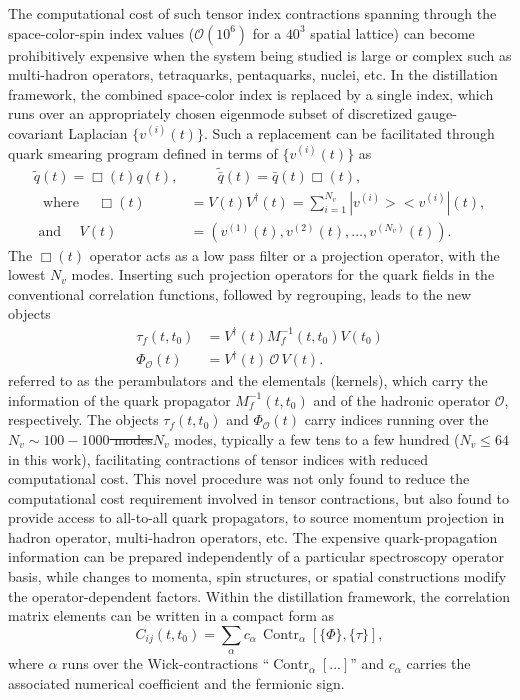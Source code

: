 \documentclass[a4paper,fleqn]{cas-dc}
\newcommand{\del}[1]{{\color{red}\sout{#1}}}
\newcommand{\add}[1]{{\color{blue}#1}}
\begin{document}
The computational cost of such tensor index contractions spanning through the space-color-spin index values ($\mathcal{O}(10^6)$ for a $40^3$ spatial lattice) can become prohibitively expensive when the system being studied is large or complex such as multi-hadron operators, tetraquarks, pentaquarks, nuclei, etc. In the distillation framework, the combined space-color index is replaced by a single index, which runs over an appropriately chosen eigenmode subset of discretized gauge-covariant Laplacian $\{v^{(i)}(t)\}$. Such a replacement can be facilitated through quark smearing program defined in terms of $\{v^{(i)}(t)\}$ as
\begin{align}
\tilde q(t)=\Box(t)q(t), &\qquad
\tilde{\bar q}(t)=\bar q(t)\Box(t), \nonumber \\
\mbox{~~where ~~~} \Box(t)&=V(t)V^\dagger(t) = \sum_{i=1}^{N_v}|v^{(i)}><v^{(i)}|(t),  \nonumber \\
\mbox{~and ~~~} V(t)&=\left(v^{(1)}(t),v^{(2)}(t),\ldots,v^{(N_v)}(t)\right). \label{eq:distill}
\end{align}
The $\Box(t)$ operator acts as a low pass filter or a projection operator, with the lowest $N_v$ modes. Inserting such projection operators for the quark fields in the conventional correlation functions, followed by regrouping, leads to the new objects
\begin{align}
\tau_f(t,t_0) &= V^\dagger(t) M_f^{-1}(t,t_0) V(t_0) \label{eq:peram}\\
\Phi_{\mathcal{O}}(t)&= V^\dagger(t)\,\mathcal{O}\,V(t). \label{eq:kernel} 
\end{align}
referred to as the perambulators and the elementals (kernels), which carry the information of the quark propagator $M_f^{-1}(t,t_0)$ and of the hadronic operator $\mathcal O$, respectively. The objects $\tau_f(t,t_0)$ and $\Phi_{\mathcal{O}}(t)$ carry indices running over the \del{$N_v\sim100-1000$ modes}\add{$N_v$ modes, typically a few tens to a few hundred ($N_v\le64$ in this work),} facilitating contractions of tensor indices with reduced computational cost. This novel procedure was not only found to reduce the computational cost requirement involved in tensor contractions, but also found to provide access to all-to-all quark propagators, to source momentum projection in hadron operator, multi-hadron operators, etc. The expensive quark-propagation information can be prepared independently of a particular spectroscopy operator basis, while changes to momenta, spin structures, or spatial constructions modify the operator-dependent factors. Within the distillation framework, the correlation matrix elements can be written in a compact form as
\begin{equation}
C_{ij}(t,t_0)= \sum_{\alpha} c_{\alpha}\,\operatorname{Contr}_{\alpha}\left[\{\Phi\},\{\tau\}\right],
\label{eq:distillation_contraction_schematic}
\end{equation}
where $\alpha$ runs over the Wick-contractions ``$\operatorname{Contr}_{\alpha}\left[...\right]$'' and $c_{\alpha}$ carries the
associated numerical coefficient and the fermionic sign.
\end{document}
